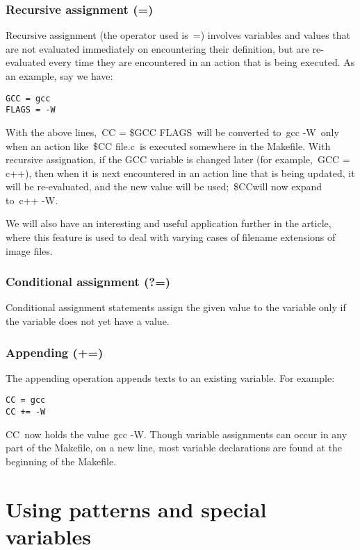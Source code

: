 \documentclass[output=paper, 
colorlinks,
citecolor=brown,
newtxmath
]{langscibook}
\begin{document}
\subsubsection {Recursive assignment (=)}

Recursive assignment (the operator used is =) involves variables and values that are not evaluated immediately on encountering their definition, but are re-evaluated every time they are encountered in an action that is being executed. As an example, say we have:

\begin{verbatim}
GCC = gcc
FLAGS = -W
\end{verbatim}

With the above lines, CC = \${GCC} {FLAGS} will be converted to gcc -W only when an action like \${CC} file.c is executed somewhere in the Makefile. With recursive assignation, if the GCC variable is changed later (for example, GCC = c++), then when it is next encountered in an action line that is being updated, it will be re-evaluated, and the new value will be used; \${CC}will now expand to c++ -W.

We will also have an interesting and useful application further in the article, where this feature is used to deal with varying cases of filename extensions of image files.

\subsubsection {Conditional assignment (?=)}

Conditional assignment statements assign the given value to the variable only if the variable does not yet have a value.

\subsubsection {Appending (+=)}

The appending operation appends texts to an existing variable. For example:

\begin{verbatim}
CC = gcc
CC += -W
\end{verbatim}

CC now holds the value gcc -W.
Though variable assignments can occur in any part of the Makefile, on a new line, most variable declarations are found at the beginning of the Makefile.

\section {Using patterns and special variables}
\end{document}
